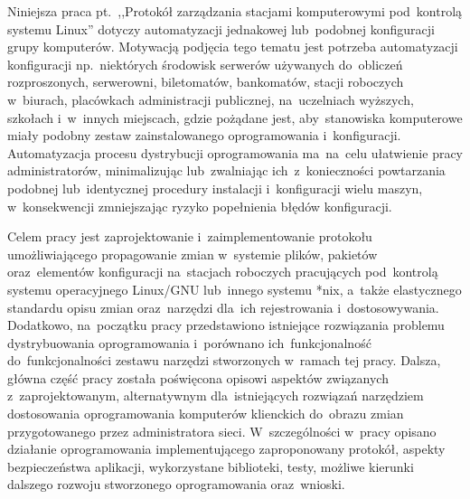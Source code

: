 \documentclass[12pt,a4paper]{article}
\begin{document}
Niniejsza praca pt.~,,Protokół zarządzania stacjami komputerowymi pod~kontrolą systemu Linux'' dotyczy automatyzacji jednakowej lub~podobnej konfiguracji grupy komputerów. Motywacją podjęcia tego tematu jest potrzeba automatyzacji konfiguracji np.~niektórych środowisk serwerów używanych do~obliczeń rozproszonych, serwerowni, biletomatów, bankomatów, stacji roboczych w~biurach, placówkach administracji publicznej, na~uczelniach wyższych, szkołach i~w~innych miejscach, gdzie pożądane jest, aby~stanowiska komputerowe miały podobny zestaw zainstalowanego oprogramowania i~konfiguracji. Automatyzacja procesu dystrybucji oprogramowania ma~na~celu ułatwienie pracy administratorów, minimalizując lub~zwalniając ich~z~konieczności powtarzania podobnej lub~identycznej procedury instalacji i~konfiguracji wielu maszyn, w~konsekwencji zmniejszając ryzyko popełnienia błędów konfiguracji.

Celem pracy jest zaprojektowanie i~zaimplementowanie protokołu umożliwiającego propagowanie zmian w~systemie plików, pakietów oraz~elementów konfiguracji na~stacjach roboczych pracujących pod~kontrolą systemu operacyjnego Linux/GNU lub~innego systemu *nix, a~także elastycznego standardu opisu zmian oraz~narzędzi dla~ich rejestrowania i~dostosowywania. Dodatkowo, na~początku pracy przedstawiono istniejące rozwiązania problemu dystrybuowania oprogramowania i~porównano ich~funkcjonalność do~funkcjonalności zestawu narzędzi stworzonych w~ramach tej pracy. Dalsza, główna część pracy została poświęcona opisowi aspektów związanych z~zaprojektowanym, alternatywnym dla~istniejących rozwiązań narzędziem dostosowania oprogramowania komputerów klienckich do~obrazu zmian przygotowanego przez administratora sieci. W~szczególności w~pracy opisano działanie oprogramowania implementującego zaproponowany protokół, aspekty bezpieczeństwa aplikacji, wykorzystane biblioteki, testy, możliwe kierunki dalszego rozwoju stworzonego oprogramowania oraz~wnioski.
\end{document}
